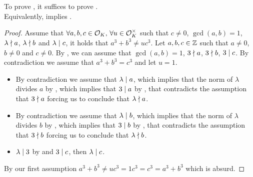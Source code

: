 \begin{lemma}
    \label{lmm:FermatLastTheoremForThree_of_FermatLastTheoremThreeGen}
    \leanok
    To prove ,
    it suffices to prove . \\
    Equivalently,  implies
    .
\end{lemma}
\begin{proof}
    \leanok
    Assume that $\forall a, b, c \in \mathcal{O}_K,\, \forall u \in \mathcal{O}^\times_K$ such that $c \neq 0$,
    $\gcd(a,b)=1$, $\lambda \nmid a$, $\lambda \nmid b$ and $\lambda \mid c$,
    it holds that $a^3 + b^3 \neq u c^3$.
    Let $a, b, c \in \mathbb{Z}$ such that $a\neq 0$, $b\neq 0$ and $c\neq 0$.
    By , we can assume that
    $\gcd(a,b)=1$, $3 \nmid a$, $3 \nmid b$, $3 \mid c$.
    By contradiction we assume that $a^3 + b^3 = c^3$ and let $u = 1$.
    \begin{itemize}
        \item By contradiction we assume that $\lambda \mid a$, which implies that the norm of
        $\lambda$ divides $a$ by , which implies that $3 \mid a$ by
        , that contradicts the assumption that $3 \nmid a$ forcing us
        to conclude that $\lambda \nmid a$.
        \item By contradiction we assume that $\lambda \mid b$, which implies that the norm of
        $\lambda$ divides $b$ by , which implies that $3 \mid b$ by
        , that contradicts the assumption that $3 \nmid b$ forcing us
        to conclude that $\lambda \nmid b$.
        \item $\lambda \mid 3$ by  and $3 \mid c$,
        then $\lambda \mid c$.
    \end{itemize}
    By our first assumption $a^3 + b^3 \neq u c^3 = 1 c^3 = c^3 = a^3 + b^3$ which is absurd.
\end{proof}